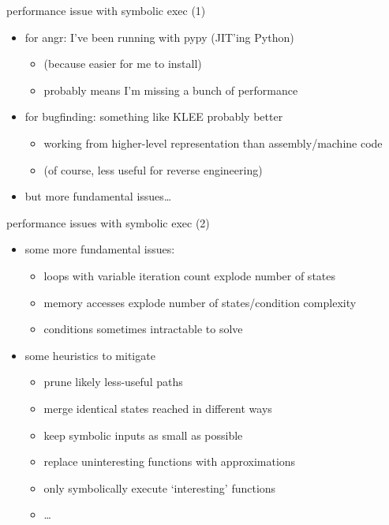 \begin{frame}{performance issue with symbolic exec (1)}
    \begin{itemize}
    \item for angr: I've been running with pypy (JIT'ing Python)
        \begin{itemize}
        \item (because easier for me to install)
        \item probably means I'm missing a bunch of performance
        \end{itemize}
    \item for bugfinding: something like KLEE probably better
        \begin{itemize}
        \item working from higher-level representation than assembly/machine code
        \item (of course, less useful for reverse engineering)
        \end{itemize}
    \item but more fundamental issues\ldots
    \end{itemize}
\end{frame}

\begin{frame}{performance issues with symbolic exec (2)}
    \begin{itemize}
    \item some more fundamental issues:
        \begin{itemize}
        \item loops with variable iteration count explode number of states
        \item memory accesses explode number of states/condition complexity
        \item conditions sometimes intractable to solve
        \end{itemize}
    \item some heuristics to mitigate
        \begin{itemize}
        \item prune likely less-useful paths
        \item merge identical states reached in different ways
        \item keep symbolic inputs as small as possible
        \item replace uninteresting functions with approximations
        \item only symbolically execute `interesting' functions
        \item \ldots
        \end{itemize}
    \end{itemize}
\end{frame}
